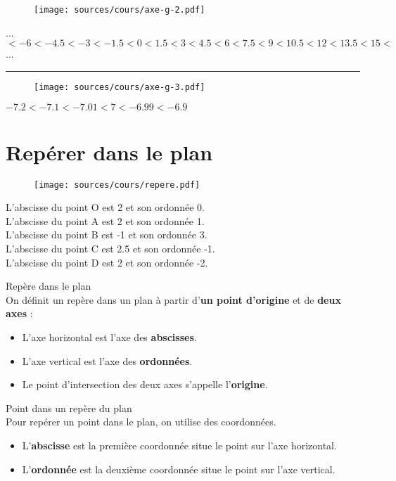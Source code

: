 \documentclass[paper=a4, fontsize=10pt]{scrartcl} %
\begin{document}
\newpage
\begin{figure}[H]
  \centering
  \texttt{[image: sources/cours/axe-g-2.pdf]}
\end{figure}
... $< -6 < -4.5 < -3 < -1.5 < 0 < 1.5 < 3 < 4.5 < 6 < 7.5 < 9 < 10.5 < 12 < 13.5 < 15 <$ ... \\
\hrule
\begin{multicols}{2}
  \begin{figure}[H]
    \centering
    \texttt{[image: sources/cours/axe-g-3.pdf]}
  \end{figure}
  $-7.2 < -7.1 < -7.01 < 7 < -6.99 < -6.9$
\end{multicols} 
\section{Repérer dans le plan}
\begin{multicols}{2}
  \begin{figure}[H]
    \centering
    \texttt{[image: sources/cours/repere.pdf]}
  \end{figure}

  L'abscisse du point O est 2 et son ordonnée 0.\\
  L'abscisse du point A est 2 et son ordonnée 1.\\
  L'abscisse du point B est -1 et son ordonnée 3.\\
  L'abscisse du point C est 2.5 et son ordonnée -1.\\
  L'abscisse du point D est 2 et son ordonnée -2.\\
\end{multicols}

\begin{Definition}{Repère dans le plan}\\
  On définit un repère dans un plan à partir d'\textbf{un point d'origine} et de \textbf{deux axes} :
  \begin{itemize}
  \item L'axe horizontal est l'axe des \textbf{abscisses}.
  \item L'axe vertical est l'axe des \textbf{ordonnées}.
  \item Le point d'intersection des deux axes s'appelle l'\textbf{origine}.
  \end{itemize}
\end{Definition}

\begin{Definition}{Point dans un repère du plan}\\
  Pour repérer un point dans le plan, on utilise des coordonnées.
  \begin{itemize}
  \item L'\textbf{abscisse} est la première coordonnée situe le point sur l'axe horizontal.
  \item L'\textbf{ordonnée} est la deuxième coordonnée situe le point sur l'axe vertical.
  \end{itemize}

\end{Definition}
\end{document}
